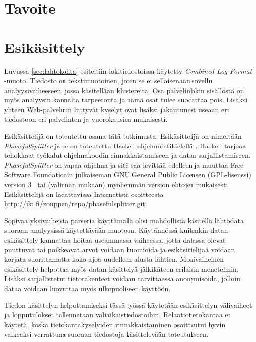 \section{Tavoite}



\section{Esikäsittely}


Luvussa \ref{sec:lahtokohta} esiteltiin lokitiedostoissa käytetty
\textit{Combined Log Format} -muoto. Tiedosto on tekstimuotoinen,
joten se ei sellaisenaan sovellu analyysivaiheeseen, jossa käsitellään
klustereita. Osa palvelinlokin sisällöstä on myös analyysin kannalta
tarpeetonta ja nämä osat tulee suodattaa pois. Lisäksi yhteen
Web-palveluun liittyvät kyselyt ovat lisäksi jakautuneet useaan eri
tiedostoon eri palvelinten ja vuorokausien mukaisesti.

Esikäsittelijä on toteutettu osana tätä tutkimusta. Esikäsittelijä on
nimeltään \textit{PhasefulSplitter} ja se on toteutettu
Haskell-ohjelmointikielellä~\cite{haskell98}. Haskell tarjoaa
tehokkaat työkalut ohjelmakoodin rinnakkaistamiseen ja datan
sarjallistamiseen. \textit{PhasefulSplitter} on vapaa ohjelma ja sitä saa
levittää edelleen ja muuttaa Free Software Foundationin julkaiseman
GNU General Public Licensen (GPL-lisenssi) version 3~\cite{gplv3} tai (valinnan
mukaan) myöhemmän version ehtojen mukaisesti. Esikäsittelijä on
ladattavissa Internetistä osoitteesta \\
\url{http://iki.fi/zouppen/repo/phasefulsplitter.git}.

Sopivaa yksivaiheista parseria käyttämällä olisi mahdollista käsitellä
lähtödata suoraan analyysissä käytettävään muotoon. Käytännössä
kuitenkin datan esikäsittely kannattaa hoitaa useammassa vaiheessa,
jotta datassa olevat puuttuvat tai poikkeavat arvot voidaan huomioida
ja esikäsittelijää voidaan korjata suorittamatta koko ajoa uudelleen
alusta lähtien. Monivaiheinen esikäsittely helpottaa myös datan
käsittelyä jälkikäteen erilaisin menetelmin. Lisäksi sarjallistetut
tietorakenteet voidaan tarvittaessa anonymisoida, jolloin dataa
voidaan luovuttaa myös ulkopuoliseen käyttöön.

Tiedon käsittelyn helpottamiseksi tässä työssä käytetään esikäsittelyn
välivaiheet ja lopputulokset tallennetaan väliaikaistiedostoihin.
Relaatiotietokantaa ei käytetä, koska tietokantakyselyiden
rinnakkaistaminen osoittautui hyvin vaikeaksi verrattuna suoraan
tiedostoja käsittelevään toteutukseen.

